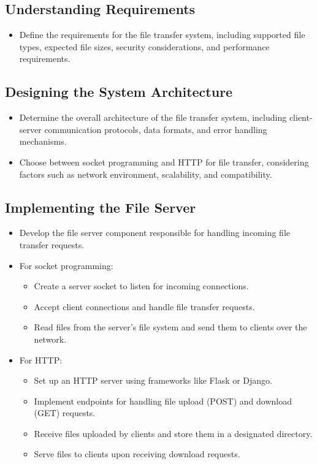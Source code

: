 \documentclass[11pt]{article}
\begin{document}
\subsection{Understanding Requirements}

\begin{itemize}
  \item Define the requirements for the file transfer system, including supported file types, expected file sizes, security considerations, and performance requirements.
\end{itemize}

\subsection{Designing the System Architecture}

\begin{itemize}
  \item Determine the overall architecture of the file transfer system, including client-server communication protocols, data formats, and error handling mechanisms.
  \item Choose between socket programming and HTTP for file transfer, considering factors such as network environment, scalability, and compatibility.
\end{itemize}

\subsection{Implementing the File Server}

\begin{itemize}
  \item Develop the file server component responsible for handling incoming file transfer requests.
  \item For socket programming:
    \begin{itemize}
      \item Create a server socket to listen for incoming connections.
      \item Accept client connections and handle file transfer requests.
      \item Read files from the server's file system and send them to clients over the network.
    \end{itemize}
  \item For HTTP:
    \begin{itemize}
      \item Set up an HTTP server using frameworks like Flask or Django.
      \item Implement endpoints for handling file upload (POST) and download (GET) requests.
      \item Receive files uploaded by clients and store them in a designated directory.
      \item Serve files to clients upon receiving download requests.
    \end{itemize}
\end{itemize}
\end{document}
